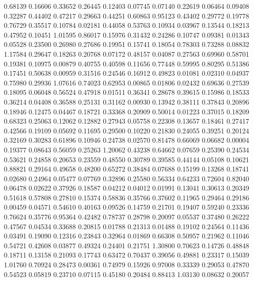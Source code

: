   0.68139 0.16606
  0.33652 0.26445
  0.12403 0.07745
  0.07140 0.22619
  0.06464 0.09408
  0.32287 0.44402
  0.47217 0.29663
  0.44251 0.60863
  0.95123 0.43402
  0.29772 0.19778
  0.76729 0.35517
  0.10784 0.02181
  0.44058 0.53763
  0.10934 0.03967
  0.13544 0.18213
  0.47952 0.10451
  1.01595 0.86017
  0.15976 0.31432
  0.24286 0.10747
  0.09381 0.01343
  0.05528 0.23500
  0.26980 0.27686
  0.19951 0.15741
  0.18054 0.78303
  0.73288 0.08832
  1.17584 0.29647
  0.18263 0.20768
  0.07172 0.48157
  0.04087 0.27563
  0.69960 0.58701
  0.19381 0.10975
  0.00879 0.40755
  0.40598 0.11656
  0.77448 0.59995
  0.80295 0.51386
  0.17451 0.50638
  0.00959 0.31516
  0.24546 0.16912
  0.49823 0.01081
  0.02310 0.04937
  0.75980 0.29936
  1.07616 0.74023
  0.62953 0.00865
  0.01806 0.02432
  0.69636 0.27539
  0.18095 0.06048
  0.56524 0.47918
  0.01511 0.36341
  0.28678 0.39615
  0.15986 0.18533
  0.36214 0.04408
  0.36588 0.25131
  0.31162 0.00930
  0.13942 0.38111
  0.37843 0.20896
  0.18946 0.12475
  0.04467 0.18721
  0.33368 0.20909
  0.50014 0.01223
  0.37015 0.18209
  0.68323 0.25063
  0.12062 0.12882
  0.27943 0.05758
  0.22308 0.13657
  0.18461 0.27417
  0.42566 0.19109
  0.05692 0.11695
  0.29500 0.10220
  0.21830 0.24055
  0.39251 0.20124
  0.32169 0.30283
  0.61896 0.10946
  0.24738 0.02570
  0.81478 0.66069
  0.06682 0.00004
  0.19377 0.08643
  0.56059 0.25263
  1.20062 0.43238
  0.64662 0.07659
  0.25390 0.24534
  0.53621 0.24858
  0.20653 0.23559
  0.48550 0.30789
  0.39585 0.44144
  0.05108 0.10621
  0.88821 0.29164
  0.49658 0.48200
  0.65272 0.38484
  0.07688 0.15199
  0.13268 0.18741
  0.02680 0.24964
  0.05477 0.07769
  0.32896 0.25580
  0.56334 0.64233
  0.72604 0.82040
  0.06478 0.02622
  0.37926 0.18587
  0.04212 0.04012
  0.01991 0.13041
  0.30613 0.20349
  0.51618 0.57808
  0.27810 0.15374
  0.58836 0.35766
  0.37602 0.11965
  0.29464 0.29186
  0.00459 0.04571
  0.54610 0.40163
  0.09526 0.14759
  0.21701 0.19407
  0.59240 0.23336
  0.76624 0.35776
  0.95364 0.42482
  0.78737 0.28798
  0.20097 0.05537
  0.37480 0.26222
  0.47567 0.04534
  0.33688 0.20815
  0.01788 0.21313
  0.01488 0.19102
  0.24564 0.11436
  0.03491 0.19090
  0.12316 0.23843
  0.32964 0.01869
  0.66308 0.50957
  0.21962 0.11046
  0.54721 0.42608
  0.03877 0.49324
  0.24401 0.21751
  1.30800 0.70623
  0.14726 0.48848
  0.18711 0.13158
  0.21093 0.17743
  0.63472 0.70437
  0.39056 0.49881
  0.23317 0.15039
  1.01760 0.70924
  0.28473 0.00361
  0.74979 0.15926
  0.97008 0.33339
  0.29053 0.47870
  0.54523 0.05819
  0.23710 0.07115
  0.45180 0.20484
  0.88413 1.03130
  0.08632 0.20057
